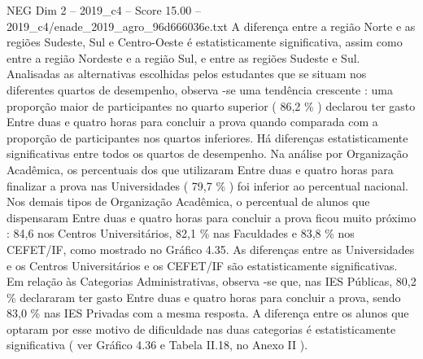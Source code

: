 \begin{textsample}{NEG Dim 2 – 2019\_c4 – Score 15.00 – 2019\_c4/enade\_2019\_agro\_96d666036e.txt}
A diferença entre a região Norte e as regiões Sudeste, Sul e Centro-Oeste é estatisticamente significativa, assim como entre a região Nordeste e a região Sul, e entre as regiões Sudeste e Sul.
Analisadas as alternativas escolhidas pelos estudantes que se situam nos diferentes quartos de desempenho, observa -se uma tendência crescente : uma proporção maior de participantes no quarto superior ( 86,2 \% ) declarou ter gasto Entre duas e quatro horas para concluir a prova quando comparada com a proporção de participantes nos quartos inferiores.
Há diferenças estatisticamente significativas entre todos os quartos de desempenho.
Na análise por Organização Acadêmica, os percentuais dos que utilizaram Entre duas e quatro horas para finalizar a prova nas Universidades ( 79,7 \% ) foi inferior ao percentual nacional.
Nos demais tipos de Organização Acadêmica, o percentual de alunos que dispensaram Entre duas e quatro horas para concluir a prova ficou muito próximo : 84,6 nos Centros Universitários, 82,1 \% nas Faculdades e 83,8 \% nos CEFET/IF, como mostrado no Gráfico 4.35.
As diferenças entre as Universidades e os Centros Universitários e os CEFET/IF são estatisticamente significativas.
Em relação às Categorias Administrativas, observa -se que, nas IES Públicas, 80,2 \% declararam ter gasto Entre duas e quatro horas para concluir a prova, sendo 83,0 \% nas IES Privadas com a mesma resposta.
A diferença entre os alunos que optaram por esse motivo de dificuldade nas duas categorias é estatisticamente significativa ( ver Gráfico 4.36 e Tabela II.18, no Anexo II ).

\end{textsample}
